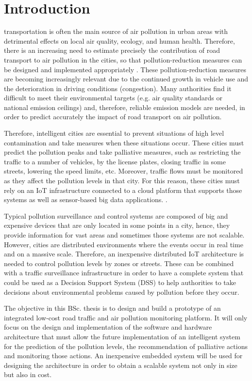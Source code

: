 



\chapter{Introduction} %
 transportation is often the main source of air pollution in urban areas with detrimental effects on local air quality, ecology, and human health. Therefore, there is an increasing need to estimate precisely the contribution of road transport to air pollution in the cities, so that pollution-reduction measures can be designed and implemented appropriately \cite{SNB10}. These pollution-reduction measures are becoming increasingly relevant due to the continued growth in vehicle use and the deterioration in driving conditions (congestion). Many authorities find it difficult to meet their environmental targets (e.g. air quality standards or national emission ceilings) and, therefore, reliable emission models are needed, in order to predict accurately the impact of road transport on air pollution.

Therefore, intelligent cities are essential to prevent situations of high level contamination and take measures when these situations occur. These cities must predict the pollution peaks and take palliative measures, such as restricting the traffic to a number of vehicles, by the license plates, closing traffic in some streets, lowering the speed limits, etc. Moreover, traffic flows must be monitored as they affect the pollution levels in that city. For this reason, these cities must rely on an \ac{IoT} infrastructure connected to a cloud platform that supports those systems as well as sensor-based big data applications. \cite{Bib18}.

Typical pollution surveillance and control systems are composed of big and expensive devices that are only located in some points in a city, hence, they provide information for vast areas and sometimes those systems are not scalable. However, cities are distributed environments where the events occur in real time and on a massive scale. Therefore, an inexpensive distributed IoT architecture is needed to control pollution levels by zones or streets. These can be combined with a traffic surveillance infrastructure in order to have a complete system that could be used as a Decision Support System (DSS) to help authorities to take decisions about environmental problems caused by pollution before they occur.

The objective in this \ac{BSc.} thesis is to design and build a prototype of an integrated low-cost road traffic and air pollution monitoring platform. It will only focus on the design and implementation of the software and hardware architecture that must allow the future implementation of an intelligent system for the prediction of the pollution levels, the recommendation of palliative actions and monitoring those actions. An inexpensive embedded system will be used for designing the architecture in order to obtain a scalable system not only in size but also in cost.


